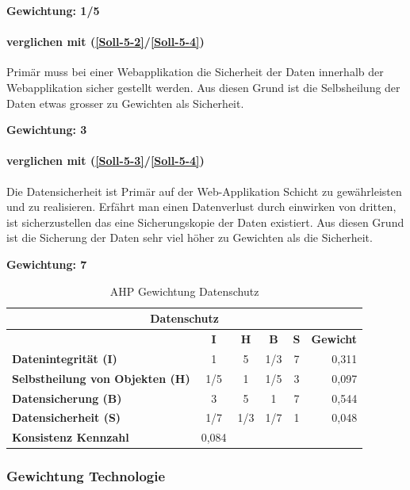 \textbf{Gewichtung: 1/5}

\paragraph*{ verglichen mit  (\ref{Soll-5-2}/\ref{Soll-5-4})}
Primär muss bei einer Webapplikation die Sicherheit der Daten innerhalb der Webapplikation sicher gestellt werden. Aus diesen Grund ist die Selbsheilung der Daten etwas grosser zu Gewichten als Sicherheit.

\textbf{Gewichtung: 3}

\paragraph*{ verglichen mit  (\ref{Soll-5-3}/\ref{Soll-5-4})}
Die Datensicherheit ist Primär auf der Web-Applikation Schicht zu gewährleisten und zu realisieren. Erfährt man einen Datenverlust durch einwirken von dritten, ist sicherzustellen das eine Sicherungskopie der Daten existiert. Aus diesen Grund ist die Sicherung der Daten sehr viel höher zu Gewichten als die Sicherheit.  

\textbf{Gewichtung: 7}

\begin{table}[htbp]
\caption{AHP Gewichtung Datenschutz}
\begin{tabular}{|l|c|c|c|c|l|}
\hline
\multicolumn{6}{|c|}{\textbf{Datenschutz}} \\ \hline
 & \multicolumn{1}{c|}{\textbf{I}} & \multicolumn{1}{c|}{\textbf{H}} & \multicolumn{1}{c|}{\textbf{B}} & \multicolumn{1}{c|}{\textbf{S}} & \multicolumn{1}{l|}{\textbf{Gewicht}} \\ \hline
\textbf{Datenintegrität (I)} & 1 & 5 & 1/3 & 7 & \multicolumn{1}{r|}{0,311} \\ \hline
\textbf{Selbstheilung von Objekten (H)} & 1/5 & 1 & 1/5 & 3 & \multicolumn{1}{r|}{0,097} \\ \hline
\textbf{Datensicherung (B)} & 3 & 5 & 1 & 7 & \multicolumn{1}{r|}{0,544} \\ \hline
\textbf{Datensicherheit (S)} & 1/7 & 1/3 & 1/7 & 1 & \multicolumn{1}{r|}{0,048} \\ \hline
\textbf{Konsistenz Kennzahl} & 0,084 \\ \cline{1-2}
\end{tabular}
\label{tab:AHPDatenschutz}
\end{table}

\subsubsection{Gewichtung Technologie}

